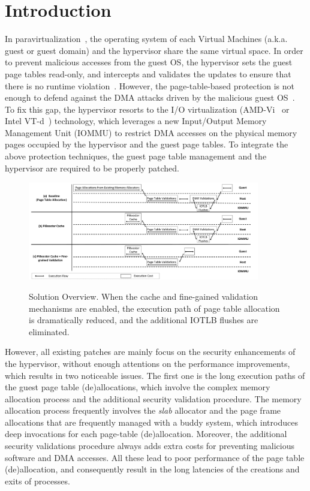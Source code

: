 \section{Introduction} \label{sec:intro}
In paravirtualization~\cite{XEN-SOSP03,whitaker2002scale}, the operating system of each Virtual Machines (a.k.a. guest or guest domain) and the hypervisor share the same virtual space.
In order to prevent malicious accesses from the guest OS, the hypervisor sets the guest page tables read-only, and intercepts and validates the updates to ensure that there is no runtime violation~\cite{XEN-SOSP03}.
However, the page-table-based protection is not enough to defend against the DMA attacks driven by the malicious guest OS~\cite{disaggregation}.
To fix this gap, the hypervisor resorts to the I/O virtualization (AMD-Vi~\cite{amdvt} or Intel VT-d~\cite{intelvt}) technology, which leverages a new Input/Output Memory Management Unit (IOMMU) to restrict DMA accesses on the physical memory pages occupied by the hypervisor and the guest page tables.
To integrate the above protection techniques, the guest page table management and the hypervisor are required to be properly patched.

\begin{figure}[ht]
\centering
\includegraphics[width=0.9\textwidth]{image/overview/overview.pdf} \\
\caption{Solution Overview. When the \name cache and fine-gained validation mechanisms are enabled, 
the execution path of page table allocation is dramatically reduced, and the additional IOTLB flushes are eliminated.}
\label{fig:overview}
\end{figure}

However, all existing patches are mainly focus on the security enhancements of the hypervisor, without enough attentions on the performance improvements, which results in two noticeable issues.
The first one is the long execution paths of the guest page table (de)allocations, which involve the complex memory allocation process and the additional security validation procedure. 
The memory allocation process frequently involves the \emph{slab} allocator and the page frame allocations that are frequently managed with a buddy system, which introduces deep invocations for each page-table (de)allocation.
Moreover, the additional security validations procedure always adds extra costs for preventing malicious software and DMA accesses.  
All these lead to poor performance of the page table (de)allocation, and consequently result in the long latencies of the creations and exits of processes. 

